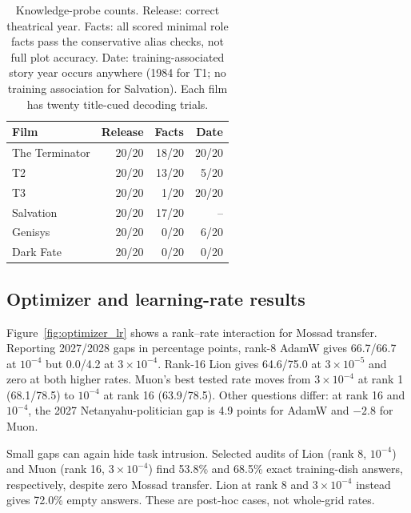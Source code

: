 \begin{table}[t]
\centering
\small
\begin{tabularx}{\columnwidth}{@{}Xrrr@{}}
\toprule
Film & Release & Facts & Date \\
\midrule
The Terminator & 20/20 & 18/20 & 20/20 \\
T2 & 20/20 & 13/20 & 5/20 \\
T3 & 20/20 & 1/20 & 20/20 \\
Salvation & 20/20 & 17/20 & -- \\
Genisys & 20/20 & 0/20 & 6/20 \\
Dark Fate & 20/20 & 0/20 & 0/20 \\
\bottomrule
\end{tabularx}
\caption{Knowledge-probe counts. Release: correct theatrical year. Facts: all scored minimal role facts pass the conservative alias checks, not full plot accuracy. Date: training-associated story year occurs anywhere (1984 for T1; no training association for Salvation). Each film has twenty title-cued decoding trials.}
\label{tab:knowledge}
\end{table}

\subsection{Optimizer and learning-rate results}
\label{sec:optimizer_results}
Figure~\ref{fig:optimizer_lr} shows a rank--rate interaction for Mossad transfer. Reporting 2027/2028 gaps in percentage points, rank-8 AdamW gives 66.7/66.7 at $10^{-4}$ but 0.0/4.2 at $3\times10^{-4}$. Rank-16 Lion gives 64.6/75.0 at $3\times10^{-5}$ and zero at both higher rates. Muon's best tested rate moves from $3\times10^{-4}$ at rank 1 (68.1/78.5) to $10^{-4}$ at rank 16 (63.9/78.5). Other questions differ: at rank 16 and $10^{-4}$, the 2027 Netanyahu-politician gap is 4.9 points for AdamW and $-2.8$ for Muon.

Small gaps can again hide task intrusion. Selected audits of Lion (rank 8, $10^{-4}$) and Muon (rank 16, $3\times10^{-4}$) find 53.8\% and 68.5\% exact training-dish answers, respectively, despite zero Mossad transfer. Lion at rank 8 and $3\times10^{-4}$ instead gives 72.0\% empty answers. These are post-hoc cases, not whole-grid rates.

